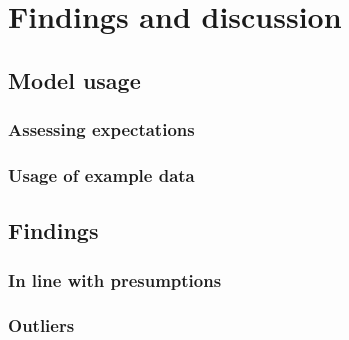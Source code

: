 \chapter{Findings and discussion}

\section{Model usage}
\subsection{Assessing expectations}
\subsection{Usage of example data}
\section{Findings}
\subsection{In line with presumptions}
\subsection{Outliers}
